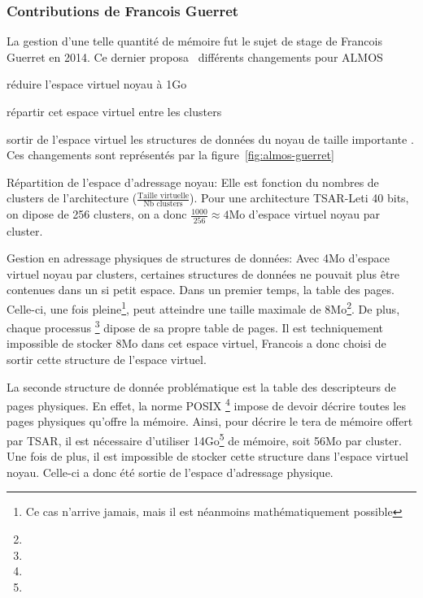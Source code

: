       
    \subsubsection{Contributions de Francois Guerret}
      
      La gestion d'une telle quantité de mémoire fut le sujet de stage de
      Francois Guerret en 2014. Ce dernier
      proposa~\cite{guerret2014exploitation} différents changements pour ALMOS
      \benumline \item réduire l'espace virtuel noyau à 1Go \item répartir cet
      espace virtuel entre les clusters \item sortir de l'espace virtuel les
      structures de données du noyau de taille importante \eenumline. Ces
      changements sont représentés par la figure~\ref{fig:almos-guerret}

      \begin{paragraph}{Répartition de l'espace d'adressage noyau:}
        Elle est fonction du nombres de clusters de l'architecture
        ($\frac{\text{Taille virtuelle}}{\text{Nb clusters}}$). Pour une
        architecture TSAR-Leti 40 bits, on dipose de 256 clusters, on a donc
        $\frac{1000}{256}\approx4$Mo d'espace virtuel noyau par cluster.
      \end{paragraph}
      \begin{paragraph}{Gestion en adressage physiques de structures de données:}
        Avec 4Mo d'espace virtuel noyau par clusters, certaines structures de
        données ne pouvait plus être contenues dans un si petit espace. Dans un
        premier temps, la table des pages. Celle-ci, une fois pleine\footnote{Ce
          cas n'arrive jamais, mais il est néanmoins mathématiquement possible},
        peut atteindre une taille maximale de 8Mo\footnote{}. De plus, chaque
        processus \footnote{}  dipose de sa
        propre table de pages. Il est techniquement impossible de stocker 8Mo
        dans cet espace virtuel, Francois a donc choisi de sortir cette
        structure de l'espace virtuel.

        La seconde structure de donnée problématique est la table des
        descripteurs de pages physiques. En effet, la norme POSIX
        \footnote{} impose de devoir décrire toutes les pages physiques qu'offre
        la mémoire. Ainsi, pour décrire le tera de mémoire offert par TSAR, il
        est nécessaire d'utiliser 14Go\footnote{} de mémoire, soit 56Mo par cluster. Une fois de plus, il
        est impossible de stocker cette structure dans l'espace virtuel
        noyau. Celle-ci a donc été sortie de l'espace d'adressage physique.
      \end{paragraph}


